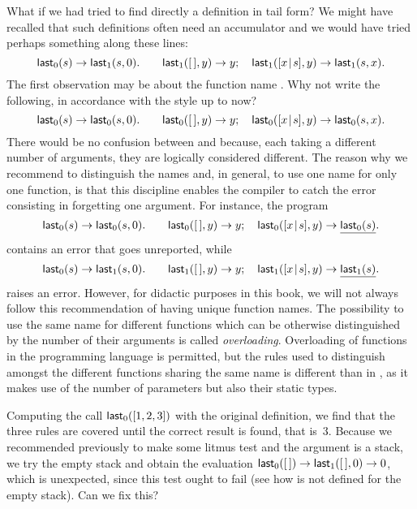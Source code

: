 What if we had tried to find directly a definition in tail form? We
might have recalled that such definitions often need an accumulator
and we would have tried perhaps something along these lines:
\begin{equation*}
\textsf{last}_0(s) \rightarrow \textsf{last}_1(s,0).\qquad
\textsf{last}_1([\,],y) \rightarrow y;\quad
\textsf{last}_1([{x}\!\mid\!{s}],y) \rightarrow \textsf{last}_1(s,x).
\end{equation*}
The first observation may be about the function name
. Why not write the following, in accordance with the
style up to now?
\begin{equation*}
\textsf{last}_0(s) \rightarrow \textsf{last}_0(s,0).\qquad
\textsf{last}_0([\,],y) \rightarrow y;\quad
\textsf{last}_0([{x}\!\mid\!{s}],y) \rightarrow \textsf{last}_0(s,x).
\end{equation*}
There would be no confusion between  and
 because, each taking a different number of
arguments, they are logically considered different. The reason why we
recommend to distinguish the names and, in general, to use one name
for only one function, is that this discipline enables the compiler to
catch the error consisting in forgetting one argument. For instance,
the program
\begin{equation*}
\textsf{last}_0(s) \rightarrow \textsf{last}_0(s,0).\qquad
\textsf{last}_0([\,],y) \rightarrow y;\quad
\textsf{last}_0([{x}\!\mid\!{s}],y) \rightarrow \underline{\textsf{last}_0(s)}.
\end{equation*}
contains an error that goes unreported, while
\begin{equation*}
\textsf{last}_0(s) \rightarrow \textsf{last}_1(s,0).\qquad
\textsf{last}_1([\,],y) \rightarrow y;\quad
\textsf{last}_1([{x}\!\mid\!{s}],y) \rightarrow \underline{\textsf{last}_1(s)}.
\end{equation*}
raises an error. However, for didactic purposes in this book, we will
not always follow this recommendation of having unique function
names. The possibility to use the same name for different functions
which can be otherwise distinguished by the number of their arguments
is called \emph{overloading}. Overloading of functions in the
programming language \Cpp is permitted, but the rules used to
distinguish amongst the different functions sharing the same name is
different than in \Erlang, as it makes use of the number of parameters
but also their static types.

Computing the call \(\textsf{last}_0([1,2,3])\) with the original
definition, we find that the three rules are covered until the correct
result is found, that is~\(3\). Because we recommended previously to
make some litmus test and the argument is a stack, we try the empty
stack and obtain the evaluation \(\textsf{last}_0([\,]) \rightarrow
\textsf{last}_1([\,],0) \rightarrow 0\), which is unexpected, since this
test ought to fail (see how  is not defined for the empty
stack). Can we fix this?

